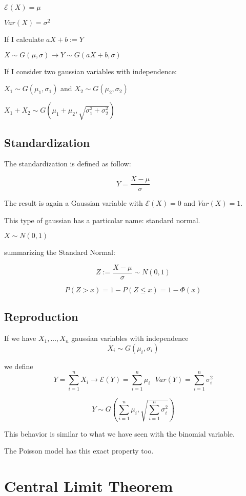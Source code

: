 \documentclass{article}
\begin{document}
\bigskip

$\mathcal E(X) = \mu$

$Var(X) = \sigma^2$

\bigskip

If I calculate $aX +b:= Y$ 

$X \sim G(\mu,\sigma) \rightarrow Y \sim G(aX +b,\sigma)$

\bigskip

If I consider two gaussian variables with independence:

$X_1 \sim G(\mu_1,\sigma_1)$ and $X_2 \sim G(\mu_2,\sigma_2)$

$X_1 + X_2 \sim G(\mu_1+\mu_2,\sqrt{\sigma_1^2 + \sigma_2^2})$

\subsection{Standardization}

The standardization is defined as follow:

$$Y = \frac{X - \mu}{\sigma}$$

The result is again a Gaussian variable with $\mathcal E(X) = 0$ and $Var(X) = 1$.

This type of gaussian has a particolar name: standard normal.

$X \sim N(0,1)$

\bigskip

summarizing the Standard Normal:

$$Z:= \frac{X -\mu}{\sigma} \sim N(0,1)$$

$$P(Z > x) = 1 - P(Z \leq x) = 1 - \Phi(x)$$

\subsection{Reproduction}

If we have $X_1,...,X_n$ gaussian variables with independence $$X_i \sim G(\mu_i,\sigma_i)$$

we define $$Y = \sum_{i=1}^n X_i \longrightarrow \mathcal E(Y) = \sum_{i=1}^n\mu_i \ \ \ Var(Y) = \sum_{i=1}^n \sigma_i^2$$

$$Y \sim G\left(\sum_{i=1}^n \mu_i, \sqrt{\sum_{i=1}^n \sigma_i^2}\right)$$

This behavior is similar to what we have seen with the binomial variable.

The Poisson model has this exact property too.

\section{Central Limit Theorem}
\end{document}
